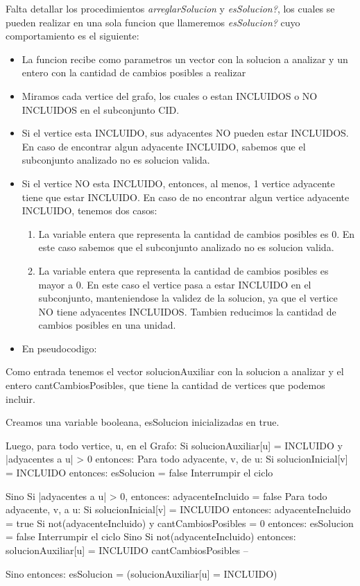 Falta detallar los procedimientos \textit{arreglarSolucion} y \textit{esSolucion?}, los cuales se pueden realizar en una sola funcion que llameremos \textit{esSolucion?} cuyo comportamiento es el siguiente:
\begin{itemize}
	\item La funcion recibe como parametros un vector con la solucion a analizar y un entero con la cantidad de cambios posibles a realizar
	\item Miramos cada vertice del grafo, los cuales o estan INCLUIDOS o NO INCLUIDOS en el subconjunto CID.
    \item Si el vertice esta INCLUIDO, sus adyacentes NO pueden estar INCLUIDOS. En caso de encontrar algun adyacente INCLUIDO, sabemos que el subconjunto analizado no es solucion valida.
    \item Si el vertice NO esta INCLUIDO, entonces, al menos, 1 vertice adyacente tiene que estar INCLUIDO. En caso de no encontrar algun vertice adyacente INCLUIDO, tenemos dos casos:
    \begin{enumerate}
    	\item La variable entera que representa la cantidad de cambios posibles es 0. En este caso sabemos que el subconjunto analizado no es solucion valida.
        \item La variable entera que representa la cantidad de cambios posibles es mayor a 0. En este caso el vertice pasa a estar INCLUIDO en el subconjunto, manteniendose la validez de la solucion, ya que el vertice NO tiene adyacentes INCLUIDOS. Tambien reducimos la cantidad de cambios posibles en una unidad.
    \end{enumerate}

    \item En pseudocodigo:

\end{itemize}

\begin{codesnippet}
Como entrada tenemos el vector solucionAuxiliar con la solucion a analizar y el entero
cantCambiosPosibles, que tiene la cantidad de vertices que podemos incluir.

Creamos una variable booleana, esSolucion inicializadas en true.

Luego, para todo vertice, u, en el Grafo:
  Si solucionAuxiliar[u] = INCLUIDO y |adyacentes a u| > 0 entonces:
     Para todo adyacente, v, de u:
         Si solucionInicial[v] = INCLUIDO entonces:
             esSolucion = false
             Interrumpir el ciclo

  Sino Si |adyacentes a u| > 0, entonces:
       adyacenteIncluido = false
       Para todo adyacente, v, a u:
          Si solucionInicial[v] = INCLUIDO entonces:
             adyacenteIncluido = true
       Si not(adyacenteIncluido) y cantCambiosPosibles = 0 entonces:
         esSolucion = false
         Interrumpir el ciclo
       Sino Si not(adyacenteIncluido) entonces:
         solucionAuxiliar[u] = INCLUIDO
         cantCambiosPosibles --

  Sino entonces:
       esSolucion = (solucionAuxiliar[u] = INCLUIDO)

\end{codesnippet}

